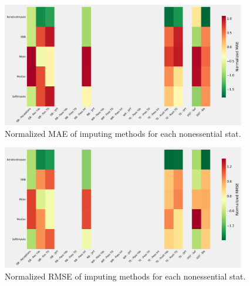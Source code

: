 \documentclass[12pt]{article}
\begin{document}
\begin{figure}[H]
  \centering
  \includegraphics[width=0.95\textwidth]{../figures/nonessential_impute_MAE}
  \caption{Normalized MAE of imputing methods for each nonessential stat.}
\end{figure}

\begin{figure}[H]
  \centering
  \includegraphics[width=0.95\textwidth]{../figures/nonessential_impute_RMSE}
  \caption{Normalized RMSE of imputing methods for each nonessential stat.}
\end{figure}
\end{document}
